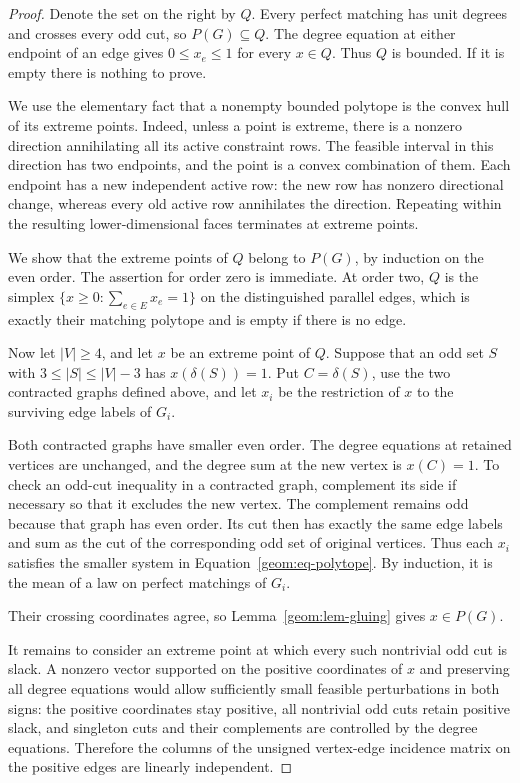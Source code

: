\begin{proof}
Denote the set on the right by \(Q\). Every perfect matching has
unit degrees and crosses every odd cut, so \(P(G)\subseteq Q\).
The degree equation at either endpoint of an edge gives
\(0\le x_e\le1\) for every \(x\in Q\). Thus \(Q\) is bounded.
If it is empty there is nothing to prove.

We use the elementary fact that a nonempty bounded polytope is the
convex hull of its extreme points. Indeed, unless a point is extreme,
there is a nonzero direction annihilating all its active constraint
rows. The feasible interval in this direction has two endpoints, and
the point is a convex combination of them. Each endpoint has a new
independent active row: the new row has nonzero directional change,
whereas every old active row annihilates the direction. Repeating
within the resulting lower-dimensional faces terminates at extreme
points.

We show that the extreme points of \(Q\) belong to \(P(G)\), by
induction on the even order. The assertion for order zero is
immediate. At order two, \(Q\) is the simplex
\(\{x\ge0:\sum_{e\in E}x_e=1\}\) on the distinguished parallel
edges, which is exactly their matching polytope and is empty if there
is no edge.

Now let \(|V|\ge4\), and let \(x\) be an extreme point of \(Q\).
Suppose that an odd set \(S\) with
\(3\le |S|\le |V|-3\) has \(x(\delta(S))=1\).
Put $C=\delta(S)$, use the two contracted graphs defined above, and
let $x_i$ be the restriction of $x$ to the surviving edge labels of $G_i$.

Both contracted graphs have smaller even order. The degree equations
at retained vertices are unchanged, and the degree sum at the new
vertex is \(x(C)=1\). To check an odd-cut inequality in a contracted
graph, complement its side if necessary so that it excludes the new
vertex. The complement remains odd because that graph has even
order. Its cut then has exactly the same edge labels and sum as the
cut of the corresponding odd set of original vertices. Thus each
\(x_i\) satisfies the smaller system in
Equation~\eqref{geom:eq-polytope}. By induction, it is the mean of a
law on perfect matchings of \(G_i\).

Their crossing coordinates agree, so Lemma~\ref{geom:lem-gluing}
gives $x\in P(G)$.

It remains to consider an extreme point at which every such
nontrivial odd cut is slack. A nonzero vector supported on the
positive coordinates of \(x\) and preserving all degree equations
would allow sufficiently small feasible perturbations in both signs:
the positive coordinates stay positive, all nontrivial odd cuts
retain positive slack, and singleton cuts and their complements are
controlled by the degree equations. Therefore the columns of the
unsigned vertex-edge incidence matrix on the positive edges are
linearly independent.


\end{proof}
